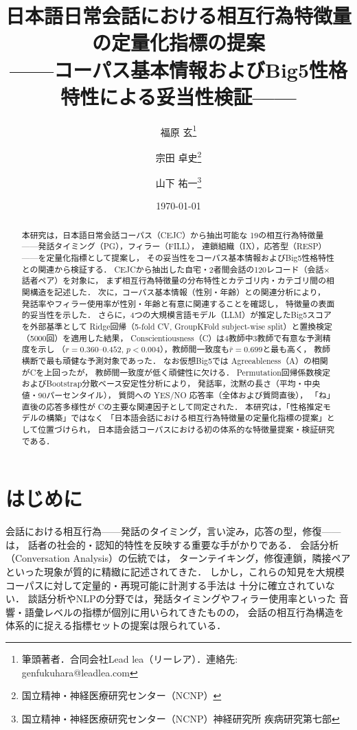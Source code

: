 \documentclass[dvipdfmx,11pt,a4paper]{bxjsarticle}
\title{日本語日常会話における相互行為特徴量の定量化指標の提案\\
——コーパス基本情報およびBig5性格特性による妥当性検証——}
\author{福原 玄\thanks{筆頭著者．合同会社Lead lea（リーレア）．連絡先: genfukuhara@leadlea.com}
\and 宗田 卓史\thanks{国立精神・神経医療研究センター（NCNP）}
\and 山下 祐一\thanks{国立精神・神経医療研究センター（NCNP）神経研究所 疾病研究第七部}}
\date{\today}
\renewcommand{\_}{\paperorigunderscore\allowbreak}%
\begin{document}
\maketitle

\begin{abstract}
本研究は，日本語日常会話コーパス（CEJC）から抽出可能な
19の相互行為特徴量——発話タイミング（PG），フィラー（FILL），
連鎖組織（IX），応答型（RESP）——を定量化指標として提案し，
その妥当性をコーパス基本情報およびBig5性格特性との関連から検証する．
CEJCから抽出した自宅・2者間会話の120レコード（会話$\times$話者ペア）を対象に，
まず相互行為特徴量の分布特性とカテゴリ内・カテゴリ間の相関構造を記述した．
次に，コーパス基本情報（性別・年齢）との関連分析により，
発話率やフィラー使用率が性別・年齢と有意に関連することを確認し，
特徴量の表面的妥当性を示した．
さらに，4つの大規模言語モデル（LLM）が推定したBig5スコアを外部基準として
Ridge回帰（5-fold CV, GroupKFold subject-wise split）と置換検定（5000回）を適用した結果，
Conscientiousness（C）は4教師中3教師で有意な予測精度を示し
（$r = 0.360$--$0.452$, $p < 0.004$），教師間一致度も$\bar{r} = 0.699$と最も高く，
教師横断で最も頑健な予測対象であった．
なお仮想Big5では Agreeableness（A）の相関がCを上回ったが，
教師間一致度が低く頑健性に欠ける．
Permutation回帰係数検定およびBootstrap分散ベース安定性分析により，
発話率，沈黙の長さ（平均・中央値・90パーセンタイル），
質問への YES/NO 応答率（全体および質問直後），
「ね」直後の応答多様性が
Cの主要な関連因子として同定された．
本研究は，「性格推定モデルの構築」ではなく
「日本語会話における相互行為特徴量の定量化指標の提案」として位置づけられ，
日本語会話コーパスにおける初の体系的な特徴量提案・検証研究である．
\end{abstract}

\section{はじめに}

会話における相互行為——発話のタイミング，言い淀み，応答の型，修復——は，
話者の社会的・認知的特性を反映する重要な手がかりである．
会話分析（Conversation Analysis）の伝統では，
ターンテイキング\cite{sacks1974}，修復連鎖\cite{schegloff1977}，隣接ペアといった現象が質的に精緻に記述されてきた．
しかし，これらの知見を大規模コーパスに対して定量的・再現可能に計測する手法は
十分に確立されていない．
談話分析やNLPの分野では，発話タイミングやフィラー使用率といった
音響・語彙レベルの指標が個別に用いられてきたものの，
会話の相互行為構造を体系的に捉える指標セットの提案は限られている．
\end{document}
